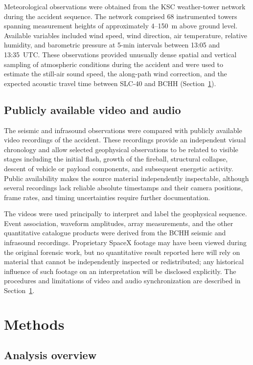 \documentclass[]{seismica}
\begin{document}
Meteorological observations were obtained from the KSC weather-tower network
during the accident sequence. The network comprised 68 instrumented towers
spanning measurement heights of approximately 4--150~m above ground level.
Available variables included wind speed, wind direction, air temperature,
relative humidity, and barometric pressure at 5-min intervals between 13:05
and 13:35~UTC. These observations provided unusually dense spatial and vertical
sampling of atmospheric conditions during the accident and were used to
estimate the still-air sound speed, the along-path wind correction, and the
expected acoustic travel time between SLC-40 and BCHH
(Section~\ref{sec:methods}).


\subsection{Publicly available video and audio}

The seismic and infrasound observations were compared with publicly available
video recordings of the accident. These recordings provide an independent
visual chronology and allow selected geophysical observations to be related to
visible stages including the initial flash, growth of the fireball, structural
collapse, descent of vehicle or payload components, and subsequent energetic
activity. Public availability makes the source material independently
inspectable, although several recordings lack reliable absolute timestamps and
their camera positions, frame rates, and timing uncertainties require further
documentation.

The videos were used principally to interpret and label the geophysical
sequence. Event association, waveform amplitudes, array measurements, and the
other quantitative catalogue products were derived from the BCHH seismic and
infrasound recordings. Proprietary SpaceX footage may have been viewed during
the original forensic work, but no quantitative result reported here will rely
on material that cannot be independently inspected or redistributed; any
historical influence of such footage on an interpretation will be disclosed
explicitly. The procedures and limitations of video and audio
synchronization are described in Section~\ref{sec:methods}.


\section{Methods}
\label{sec:methods}

\subsection{Analysis overview}
\end{document}
